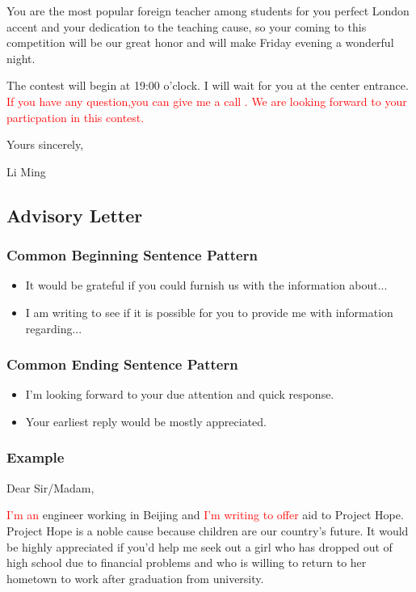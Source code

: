 \documentclass{article}
\begin{document}
\par You are the most popular foreign teacher among students for you perfect London accent
and your dedication to the teaching cause, so your coming to this competition will be our
great honor and will make Friday evening a wonderful night.

\par The contest will begin at 19:00 o'clock. I will wait for you at the center
entrance. \textcolor{red}{If you have any question,you can give me a call . We are looking
  forward to your particpation in this contest.}

\hfill Yours sincerely,

\hfill Li Ming


\subsection{Advisory Letter}
\label{sec:letter}

\subsubsection{Common Beginning Sentence Pattern}
\label{sec:comm-begnn-sent}
\begin{itemize}
\item It would be grateful if you could furnish us with the information about...
\item I am writing to see if it is possible for you to provide me with information regarding...
\end{itemize}

\subsubsection{Common Ending Sentence Pattern}
\label{sec:comm-ending-sent-2}
\begin{itemize}
\item I'm looking forward to your due attention and quick response.
\item Your earliest reply would be mostly appreciated.
\end{itemize}

\subsubsection{Example}
\label{sec:example-2}
Dear Sir/Madam,
\par \textcolor{red}{I'm an} engineer working in Beijing and \textcolor{red}{I'm writing to
  offer} aid to Project Hope. Project Hope is a noble cause because children are our
country's future. It would be highly appreciated if you'd help me seek out a girl who has
dropped out of high school due to financial problems and who is willing to return to her
hometown to work after graduation from university.
\end{document}
